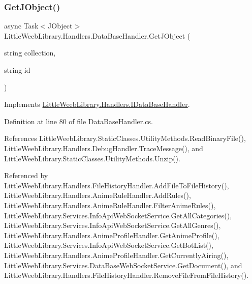\mbox{\label{class_little_weeb_library_1_1_handlers_1_1_data_base_handler_a7f61583807f99b7838a33d2db0f7ca68}} 
\subsubsection{\texorpdfstring{Get\+J\+Object()}{GetJObject()}\hspace{0.1cm}{\footnotesize\ttfamily [1/2]}}
{\footnotesize\ttfamily async Task$<$J\+Object$>$ Little\+Weeb\+Library.\+Handlers.\+Data\+Base\+Handler.\+Get\+J\+Object (\begin{DoxyParamCaption}\item[{string}]{collection,  }\item[{string}]{id }\end{DoxyParamCaption})}



Implements \mbox{\hyperlink{interface_little_weeb_library_1_1_handlers_1_1_i_data_base_handler_a6586c4d1cfebdb8d5d40bc544d51914c}{Little\+Weeb\+Library.\+Handlers.\+I\+Data\+Base\+Handler}}.



Definition at line 80 of file Data\+Base\+Handler.\+cs.



References Little\+Weeb\+Library.\+Static\+Classes.\+Utility\+Methods.\+Read\+Binary\+File(), Little\+Weeb\+Library.\+Handlers.\+Debug\+Handler.\+Trace\+Message(), and Little\+Weeb\+Library.\+Static\+Classes.\+Utility\+Methods.\+Unzip().



Referenced by Little\+Weeb\+Library.\+Handlers.\+File\+History\+Handler.\+Add\+File\+To\+File\+History(), Little\+Weeb\+Library.\+Handlers.\+Anime\+Rule\+Handler.\+Add\+Rules(), Little\+Weeb\+Library.\+Handlers.\+Anime\+Rule\+Handler.\+Filter\+Anime\+Rules(), Little\+Weeb\+Library.\+Services.\+Info\+Api\+Web\+Socket\+Service.\+Get\+All\+Categories(), Little\+Weeb\+Library.\+Services.\+Info\+Api\+Web\+Socket\+Service.\+Get\+All\+Genres(), Little\+Weeb\+Library.\+Handlers.\+Anime\+Profile\+Handler.\+Get\+Anime\+Profile(), Little\+Weeb\+Library.\+Services.\+Info\+Api\+Web\+Socket\+Service.\+Get\+Bot\+List(), Little\+Weeb\+Library.\+Handlers.\+Anime\+Profile\+Handler.\+Get\+Currently\+Airing(), Little\+Weeb\+Library.\+Services.\+Data\+Base\+Web\+Socket\+Service.\+Get\+Document(), and Little\+Weeb\+Library.\+Handlers.\+File\+History\+Handler.\+Remove\+File\+From\+File\+History().


